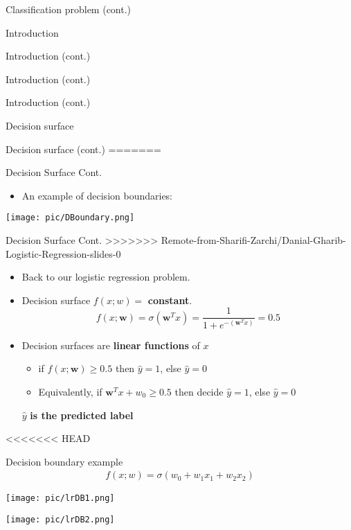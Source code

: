 \documentclass[serif, aspectratio=169]{beamer}
\begin{document}
\begin{frame}{Classification problem (cont.)}
\begin{itemize}
\begin{frame}{Introduction}
\begin{itemize}
\begin{frame}{Introduction (cont.)}
\begin{frame}{Introduction (cont.)}
\begin{frame}{Introduction (cont.)}
\begin{frame}{Decision surface}
\begin{itemize}
\begin{frame}{Decision surface (cont.)}
=======
\begin{frame}{Decision Surface Cont.}

    \begin{itemize}
        \item An example of decision boundaries:
    \end{itemize}
    \begin{center}
        \texttt{[image: pic/DBoundary.png]}
    \end{center}
\end{frame}

\begin{frame}{Decision Surface Cont.}
>>>>>>> Remote-from-Sharifi-Zarchi/Danial-Gharib-Logistic-Regression-slides-0
    \begin{itemize}
      \item Back to our logistic regression problem.
      \item Decision surface $f(x;w) = $ \textbf{constant}.
        \[
            f(x;\mathbf{w})=\sigma (\mathbf{w}^Tx) = \frac{1}{1 + e^{-(\mathbf{w}^Tx)}} = 0.5
        \]
      \item Decision surfaces are \textbf{linear functions} of $x$
        \begin{itemize}
            \item if $f(x;\mathbf{w}) \geq 0.5$ then $\hat{y}=1$, else $\hat{y} = 0$
            \item Equivalently, if $\mathbf{w}^Tx + w_0 \geq 0.5$ then decide $\hat{y}=1$, else $\hat{y}=0$
        \end{itemize}%
        \vfill
        \begin{center}
            \( \hat{y} \) \textbf{is the predicted label}
        \end{center}
    \end{itemize}
\end{frame}

<<<<<<< HEAD
\begin{frame}{Decision boundary example}
    \begin{align*}
        f(x;w) = \sigma (w_0 + w_1 x_1 + w_2 x_2)
    \end{align*}
    
    \begin{minipage}{0.35\linewidth}
        \centering
        \texttt{[image: pic/lrDB1.png]}
    \end{minipage}
    \hfill
    \begin{minipage}{0.35\linewidth}
        \centering
        \texttt{[image: pic/lrDB2.png]}
    \end{minipage}
    

\end{frame}
\end{frame}
\end{itemize}
\end{frame}
\end{frame}
\end{frame}
\end{frame}
\end{itemize}
\end{frame}
\end{itemize}
\end{frame}
\end{document}
